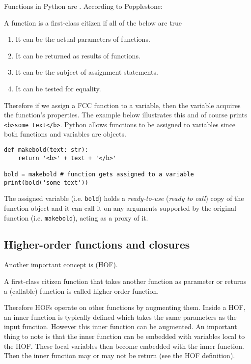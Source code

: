 \documentclass[a4paper]{article}
\begin{document}
Functions in Python are . According to Popplestone:
\begin{definition}
A function is a first-class citizen if all of the below are true
\begin{enumerate}
    \item It can be the actual parameters of functions.
    \item It can be returned as results of functions.
    \item It can be the subject of assignment statements.
    \item It can be tested for equality.
\end{enumerate}
\end{definition}
Therefore if we assign a FCC function to a variable, then the variable acquires the function's properties. The example below illustrates this and of course prints \texttt{<b>some text</b>}. Python allows functions to be assigned to variables since both functions and variables are objects.
\begin{verbatim}
def makebold(text: str):
    return '<b>' + text + '</b>'

bold = makebold # function gets assigned to a variable
print(bold('some text'))
\end{verbatim}
The assigned variable (i.e. \texttt{bold}) holds a \textit{ready-to-use} (\textit{ready to call}) copy of the function object and it can call it on any arguments supported by the original function (i.e. \texttt{makebold}), acting as a proxy of it.


\subsection{Higher-order functions and closures}
Another important concept is  (HOF). 
\begin{definition}
A first-class citizen function that takes another function as parameter or returns a (callable) function is called higher-order function.
\end{definition}
Therefore HOFs operate on other functions by augmenting them. Inside a HOF, an inner function is typically defined which takes the same parameters as the input function. However this inner function can be augmented. An important thing to note is that the inner function can be embedded with variables local to the HOF. These local variables then become embedded with the inner function. Then the inner function may or may not be return (see the HOF definition). 
\end{document}
